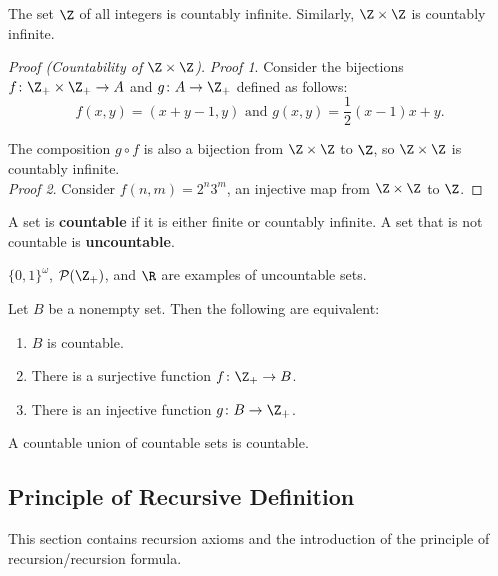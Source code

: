 \begin{eg}
The set $\Z$ of all integers is countably infinite. Similarly, $\Z \times \Z$ is countably infinite. 
\end{eg}

\begin{proof}[Proof (Countability of $\Z \times \Z$)]
\textit{Proof 1}. Consider the bijections $f \colon \Z_+ \times \Z_+ \rightarrow A$ and $g \colon A \rightarrow \Z_+$ defined as follows:
\[
    f(x, y) = (x + y - 1, y) \text{ and } g(x, y) = \frac{1}{2}(x-1)x + y.    
\]
    
The composition $g \circ f$ is also a bijection from $\Z \times \Z$ to $\Z$, so $\Z \times \Z$ is countably infinite. \\

\textit{Proof 2}. Consider $f(n, m) = 2^n 3^m$, an injective map from $\Z \times \Z$ to $\Z$.
\end{proof}

\begin{definition}
A set is \textbf{countable} if it is either finite or countably infinite. A set that is not countable is \textbf{uncountable}.
\end{definition}

\begin{eg}
$\{0, 1\}^\omega$, $\mathcal{P} (\Z_+)$, and $\R$ are examples of uncountable sets.
\end{eg}

\begin{theorem}
Let $B$ be a nonempty set. Then the following are equivalent:
\begin{enumerate}
    \item $B$ is countable.
    \item There is a surjective function $f\colon \Z_+ \rightarrow B$.
    \item There is an injective function $g\colon B \rightarrow \Z_+$.
\end{enumerate}    
\end{theorem}

\begin{theorem}
A countable union of countable sets is countable.
\end{theorem}

\subsection{Principle of Recursive Definition}
This section contains recursion axioms and the introduction of the principle of recursion/recursion formula.  

